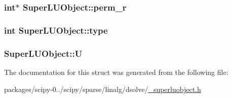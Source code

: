\subsubsection[{perm\+\_\+r}]{\setlength{\rightskip}{0pt plus 5cm}int$\ast$ Super\+L\+U\+Object\+::perm\+\_\+r}\label{structSuperLUObject_ab0fd3683677756df1a061ab36e4e789f}
\hypertarget{structSuperLUObject_ab7115b0b14b43b9acc2c5f2114fe7a47}{}
\subsubsection[{type}]{\setlength{\rightskip}{0pt plus 5cm}int Super\+L\+U\+Object\+::type}\label{structSuperLUObject_ab7115b0b14b43b9acc2c5f2114fe7a47}
\hypertarget{structSuperLUObject_a8539c48c219ad878e1b42ceebe7e1b2d}{}
\subsubsection[{U}]{ Super\+L\+U\+Object\+::\+U}\label{structSuperLUObject_a8539c48c219ad878e1b42ceebe7e1b2d}


The documentation for this struct was generated from the following file\+:\begin{DoxyCompactItemize}
\item 
packages/scipy-\/0../scipy/sparse/linalg/dsolve/\hyperlink{__superluobject_8h}{\+\_\+superluobject.\+h}\end{DoxyCompactItemize}
